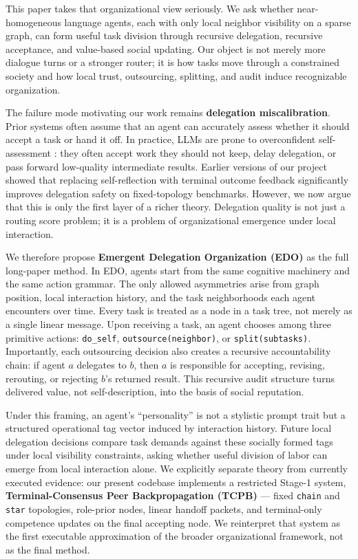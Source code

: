 \documentclass[11pt]{article}
\begin{document}
This paper takes that organizational view seriously. We ask whether near-homogeneous language agents, each with only local neighbor visibility on a sparse graph, can form useful task division through recursive delegation, recursive acceptance, and value-based social updating. Our object is not merely more dialogue turns or a stronger router; it is how tasks move through a constrained society and how local trust, outsourcing, splitting, and audit induce recognizable organization.

The failure mode motivating our work remains \textbf{delegation miscalibration}. Prior systems often assume that an agent can accurately assess whether it should accept a task or hand it off. In practice, LLMs are prone to overconfident self-assessment \citep{guo2017calibration,kadavath2022know}: they often accept work they should not keep, delay delegation, or pass forward low-quality intermediate results. Earlier versions of our project showed that replacing self-reflection \citep{shinn2023reflexion,madaan2023selfrefine} with terminal outcome feedback significantly improves delegation safety on fixed-topology benchmarks. However, we now argue that this is only the first layer of a richer theory. Delegation quality is not just a routing score problem; it is a problem of organizational emergence under local interaction.

We therefore propose \textbf{Emergent Delegation Organization (EDO)} as the full long-paper method. In EDO, agents start from the same cognitive machinery and the same action grammar. The only allowed asymmetries arise from graph position, local interaction history, and the task neighborhoods each agent encounters over time. Every task is treated as a node in a task tree, not merely as a single linear message. Upon receiving a task, an agent chooses among three primitive actions: \texttt{do\_self}, \texttt{outsource(neighbor)}, or \texttt{split(subtasks)}. Importantly, each outsourcing decision also creates a recursive accountability chain: if agent $a$ delegates to $b$, then $a$ is responsible for accepting, revising, rerouting, or rejecting $b$'s returned result. This recursive audit structure turns delivered value, not self-description, into the basis of social reputation.

Under this framing, an agent's ``personality'' is not a stylistic prompt trait but a structured operational tag vector induced by interaction history. Future local delegation decisions compare task demands against these socially formed tags under local visibility constraints, asking whether useful division of labor can emerge from local interaction alone. We explicitly separate theory from currently executed evidence: our present codebase implements a restricted Stage-1 system, \textbf{Terminal-Consensus Peer Backpropagation (TCPB)} --- fixed \texttt{chain} and \texttt{star} topologies, role-prior nodes, linear handoff packets, and terminal-only competence updates on the final accepting node. We reinterpret that system as the first executable approximation of the broader organizational framework, not as the final method.
\end{document}
